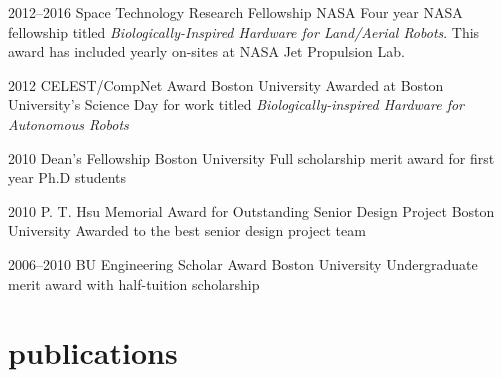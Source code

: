 \documentclass[]{friggeri-cv} %
\begin{document}
\begin{entrylist}


\entry
{2012--2016}
{Space Technology Research Fellowship}
{NASA}
{Four year NASA fellowship titled \emph{Biologically-Inspired Hardware for Land/Aerial Robots}. This award has included yearly on-sites at NASA Jet Propulsion Lab.}

\entry
{2012}
{CELEST/CompNet Award}
{Boston University}
{Awarded at Boston University's Science Day for work titled \emph{Biologically-inspired Hardware for Autonomous Robots}}

\entry
{2010}
{Dean's Fellowship}
{Boston University}
{Full scholarship merit award for first year Ph.D students}

\entry
{2010}
{P. T. Hsu Memorial Award for Outstanding Senior Design Project}
{Boston University}
{Awarded to the best senior design project team}

\entry
{2006--2010}
{BU Engineering Scholar Award}
{Boston University}
{Undergraduate merit award with half-tuition scholarship}


\end{entrylist}





\section{publications}




\end{document}
